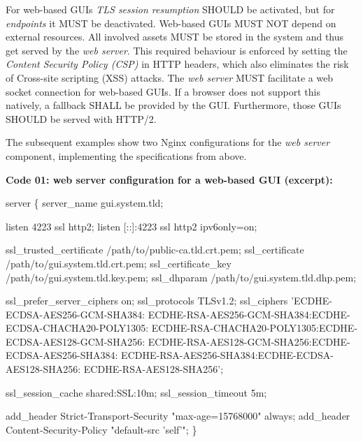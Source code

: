 \documentclass[12pt,english,a4paper,titlepage,cleardoublepage=empty,dottedtoc]{report}
\newenvironment{Shaded}{\begin{snugshade}}{\end{snugshade}}
\newcommand{\NormalTok}[1]{#1}
\begin{document}
For web-based GUIs \emph{TLS session resumption} SHOULD be activated,
but for \emph{endpoints} it MUST be deactivated. Web-based GUIs MUST NOT
depend on external resources. All involved assets MUST be stored in the
system and thus get served by the \emph{web server}. This required
behaviour is enforced by setting the \emph{Content Security Policy
(CSP)} in HTTP headers, which also eliminates the risk of Cross-site
scripting (XSS) attacks. The \emph{web server} MUST facilitate a web
socket connection for web-based GUIs. If a browser does not support this
natively, a fallback SHALL be provided by the GUI. Furthermore, those
GUIs SHOULD be served with HTTP/2.

The subsequent examples show two Nginx configurations for the \emph{web
server} component, implementing the specifications from above.

\textbf{\protect\hypertarget{spec_code-01_nginx-config-web-gui}{}{Code
01: web server configuration for a web-based GUI (excerpt)}:}

\begin{Shaded}
\begin{Highlighting}[numbers=left,,]
\NormalTok{server \{}
\NormalTok{    server_name gui.system.tld;}

\NormalTok{    listen 4223 ssl http2;}
\NormalTok{    listen [::]:4223 ssl http2 ipv6only=on;}
    
\NormalTok{    ssl_trusted_certificate /path/to/public-ca.tld.crt.pem;}
\NormalTok{    ssl_certificate         /path/to/gui.system.tld.crt.pem;}
\NormalTok{    ssl_certificate_key     /path/to/gui.system.tld.key.pem;}
\NormalTok{    ssl_dhparam             /path/to/gui.system.tld.dhp.pem;}
    
\NormalTok{    ssl_prefer_server_ciphers on;}
\NormalTok{    ssl_protocols TLSv1.2;}
\NormalTok{    ssl_ciphers 'ECDHE-ECDSA-AES256-GCM-SHA384:}
\NormalTok{        ECDHE-RSA-AES256-GCM-SHA384:ECDHE-ECDSA-CHACHA20-POLY1305:}
\NormalTok{        ECDHE-RSA-CHACHA20-POLY1305:ECDHE-ECDSA-AES128-GCM-SHA256:}
\NormalTok{        ECDHE-RSA-AES128-GCM-SHA256:ECDHE-ECDSA-AES256-SHA384:}
\NormalTok{        ECDHE-RSA-AES256-SHA384:ECDHE-ECDSA-AES128-SHA256:}
\NormalTok{        ECDHE-RSA-AES128-SHA256';}

\NormalTok{    ssl_session_cache shared:SSL:10m;}
\NormalTok{    ssl_session_timeout 5m;}
    
\NormalTok{    add_header Strict-Transport-Security "max-age=15768000" always;}
\NormalTok{    add_header Content-Security-Policy "default-src 'self'";}
\NormalTok{\}}
\end{Highlighting}
\end{Shaded}
\end{document}
